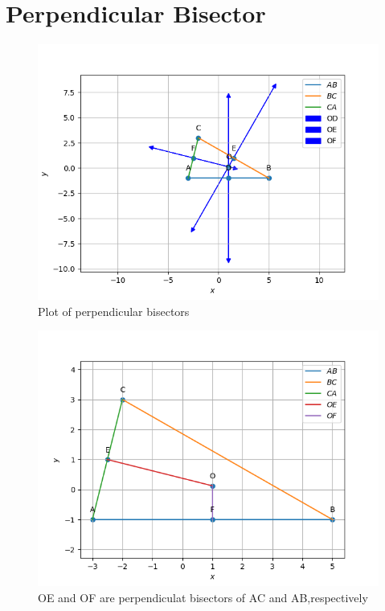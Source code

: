 \documentclass[journal,12pt,twocolumn]{IEEEtran}
\theoremstyle{remark}
\begin{document}
\section{Perpendicular Bisector}
\begin{figure}[!ht]
              \centering
              \includegraphics[width=\columnwidth]{./figs/fig1.4.1.png}
              \caption{Plot of perpendicular bisectors}
              \label{fig:11}
\end{figure}
\begin{figure}[!ht]
              \centering
              \includegraphics[width=\columnwidth]{./figs/fig1.4.2.png}
              \caption{OE and OF are perpendiculat bisectors of AC and AB,respectively}
              \label{fig:12}
\end{figure}
\end{document}
